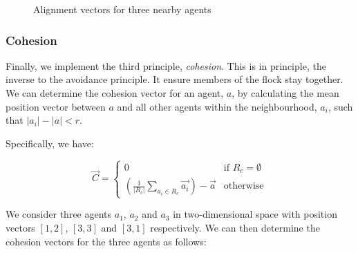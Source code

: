 \documentclass[12pt]{article}
\begin{document}
\begin{figure}[H]
    \centering
    \caption{Alignment vectors for three nearby agents}
    \label{fig:alignment-2d}
\end{figure}


\subsubsection{Cohesion}

Finally, we implement the third principle, \emph{cohesion}. This is in principle, the inverse to the avoidance principle. It ensure members of the flock stay together. We can determine the cohesion vector for an agent, $a$, by calculating the mean position vector between $a$ and all other agents within the neighbourhood, $a_i$, such that $|a_i| - |a| < r$.

Specifically, we have:

\begin{equation}
\vec{C} =
\begin{cases}
    0 & \text{if } R_c = \emptyset \\
    \left(
    \frac{1}{|R_c|} \sum_{a_i \in R_c} \vec{a_i} \right) - \vec{a} & \text{otherwise}
\end{cases}
\end{equation}

We consider three agents $a_1$, $a_2$ and $a_3$ in two-dimensional space with position vectors $[1,2]$, $[3,3]$ and $[3,1]$ respectively. We can then determine the cohesion vectors for the three agents as follows:
\end{document}
